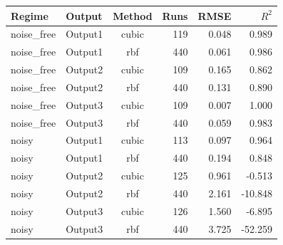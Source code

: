 \begin{tabular}{llcrrr}
\toprule
Regime & Output & Method & Runs & RMSE & $R^2$ \\
\midrule
noise_free & Output1 & cubic & 119 & 0.048 & 0.989 \\
noise_free & Output1 & rbf & 440 & 0.061 & 0.986 \\
noise_free & Output2 & cubic & 109 & 0.165 & 0.862 \\
noise_free & Output2 & rbf & 440 & 0.131 & 0.890 \\
noise_free & Output3 & cubic & 109 & 0.007 & 1.000 \\
noise_free & Output3 & rbf & 440 & 0.059 & 0.983 \\
noisy & Output1 & cubic & 113 & 0.097 & 0.964 \\
noisy & Output1 & rbf & 440 & 0.194 & 0.848 \\
noisy & Output2 & cubic & 125 & 0.961 & -0.513 \\
noisy & Output2 & rbf & 440 & 2.161 & -10.848 \\
noisy & Output3 & cubic & 126 & 1.560 & -6.895 \\
noisy & Output3 & rbf & 440 & 3.725 & -52.259 \\
\bottomrule
\end{tabular}
